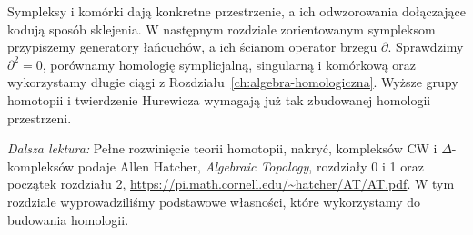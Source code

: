 \begin{uwaga}
Sympleksy i komórki dają
konkretne przestrzenie, a ich
odwzorowania dołączające kodują sposób
sklejenia. W następnym rozdziale
zorientowanym sympleksom przypiszemy
generatory łańcuchów, a ich ścianom
operator brzegu $\partial$.
Sprawdzimy $\partial^2=0$,
porównamy homologię symplicjalną,
singularną i komórkową oraz
wykorzystamy długie ciągi
z Rozdziału~\ref{ch:algebra-homologiczna}.
Wyższe grupy homotopii i twierdzenie
Hurewicza wymagają już tak
zbudowanej homologii przestrzeni.
\end{uwaga}

\par\smallskip
{\footnotesize\noindent\emph{Dalsza lektura:}
Pełne rozwinięcie teorii homotopii,
nakryć, kompleksów CW i
$\Delta$-kompleksów podaje
Allen Hatcher, \emph{Algebraic Topology},
rozdziały 0 i 1 oraz początek rozdziału 2,
\url{https://pi.math.cornell.edu/~hatcher/AT/AT.pdf}.
W tym rozdziale wyprowadziliśmy
podstawowe własności, które
wykorzystamy do budowania homologii.\par}

\clearpage
